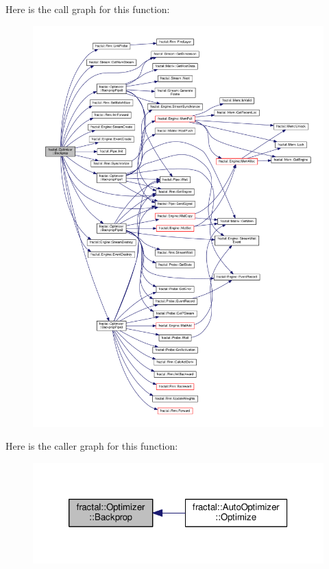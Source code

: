 Here is the call graph for this function\+:\nopagebreak
\begin{figure}[H]
\begin{center}
\leavevmode
\includegraphics[width=350pt]{d8/ddf/classfractal_1_1Optimizer_a64b16b4d1cf533253a137a2bb6744b53_cgraph}
\end{center}
\end{figure}




Here is the caller graph for this function\+:\nopagebreak
\begin{figure}[H]
\begin{center}
\leavevmode
\includegraphics[width=320pt]{d8/ddf/classfractal_1_1Optimizer_a64b16b4d1cf533253a137a2bb6744b53_icgraph}
\end{center}
\end{figure}


